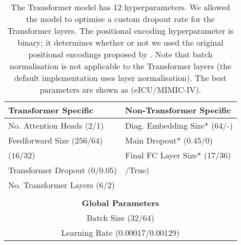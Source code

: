\documentclass[sigconf]{acmart}
\begin{document}
\begin{table}[h]
  \caption{The Transformer model has 12 hyperparameters. We allowed the model to optimise a custom dropout rate for the Transformer layers. The positional encoding hyperparameter is binary; it determines whether or not we used the original positional encodings proposed by \citet{46201}. Note that batch normalisation is not applicable to the Transformer layers (the default implementation uses layer normalisation). The best parameters are shown as (eICU/MIMIC-IV).}
  \label{tab:Transformerhyperparams}
  \centering
  \begin{tabular}{ll}
    \toprule
    \textbf{Transformer Specific} & \textbf{Non-Transformer Specific} \\
    \midrule
    No. Attention Heads (2/1)&Diag. Embedding Size* (64/-)\\
    Feedforward Size (256/64)&Main Dropout* (0.45/0)\\
     (16/32)&Final FC Layer Size* (17/36)\\
    Transformer Dropout (0/0.05)& /True)\\
    No. Transformer Layers (6/2)&\\
    \vspace{-0.8em}\\
    \toprule
    \multicolumn{2}{c}{\textbf{Global Parameters}}\\
    \midrule
    \multicolumn{2}{c}{Batch Size (32/64)}\\
    \multicolumn{2}{c}{Learning Rate (0.00017/0.00129)}\\
    \bottomrule
  \end{tabular}
\end{table}
\end{document}
